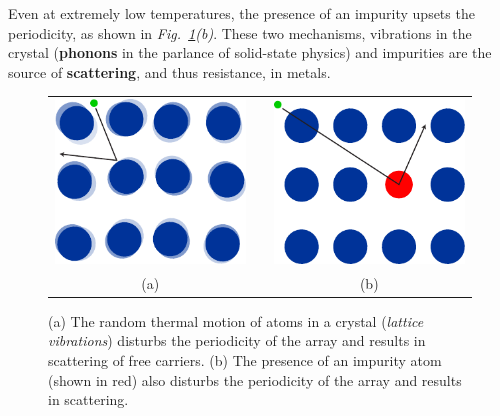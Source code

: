 Even at extremely low temperatures, the presence of an impurity upsets the periodicity, as shown in \emph{Fig.~\ref{fig:slide16}(b)}.  These two mechanisms, vibrations in the crystal (\textbf{phonons} in the parlance of solid-state physics) and impurities are the source of \textbf{scattering}, and thus resistance, in metals.
\begin{figure}[tb]
\centering
\begin{tabular}{ccc}
\includegraphics[width=.3\columnwidth]{lattice_vibrate} &
\hspace{.15\columnwidth} &
\includegraphics[width=.3\columnwidth]{lattice_impurity}\\
(a) & & (b)\\
\end{tabular}
\caption{(a) The random thermal motion of atoms in a crystal (\emph{lattice vibrations}) disturbs the periodicity of the array and results in scattering of free carriers.  (b) The presence of an impurity atom (shown in red) also disturbs the periodicity of the array and results in scattering.}
\label{fig:slide16}
\end{figure}
